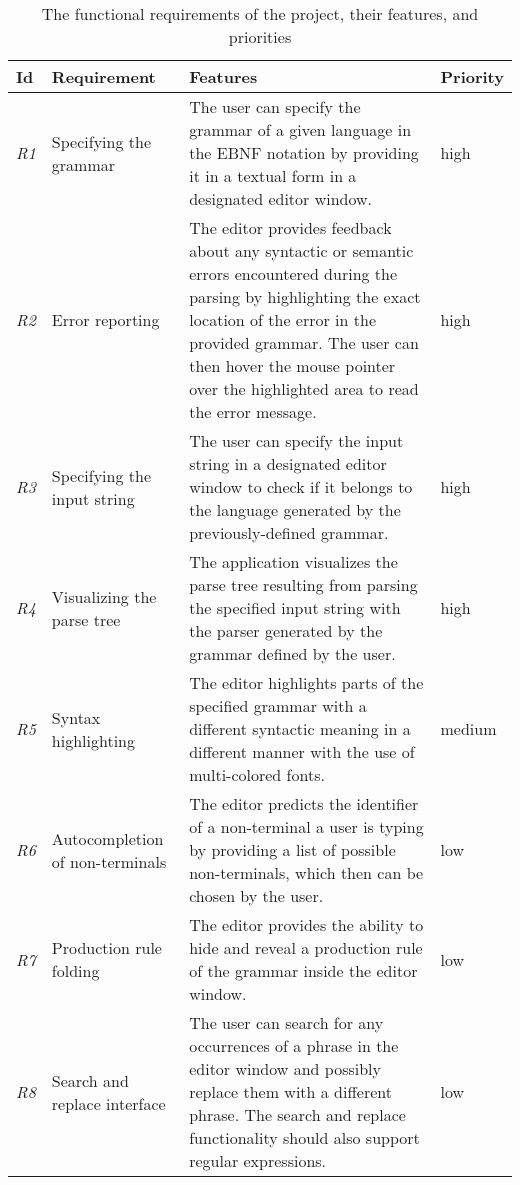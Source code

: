 \documentclass[english,engineering]{wizthesis}
\begin{document}
\begin{table}[H]
  \centering
  \caption{The functional requirements of the project, their features, and
  priorities}
  \label{tab:functional-requirements}
  \begin{tabularx}{\textwidth}{@{}lL{3cm}Xl@{}}
    \toprule
    Id & Requirement & Features & Priority \\
    \midrule
    \emph{R1} & Specifying the grammar & The user can specify the grammar of a
    given language in the EBNF notation by providing it in a textual form in
    a designated editor window. & high \\
    \addlinespace[0.5em] \emph{R2} & Error reporting & The editor provides
    feedback about any syntactic or semantic errors encountered during the
    parsing by highlighting the exact location of the error in the provided
    grammar. The user can then hover the mouse pointer over the highlighted area
    to read the error message. & high \\
    \addlinespace[0.5em] \emph{R3} & Specifying the input string & The user can
    specify the input string in a designated editor window to check if it
    belongs to the language generated by the previously-defined grammar. & high
    \\
    \addlinespace[0.5em] \emph{R4} & Visualizing the parse tree & The
    application visualizes the parse tree resulting from parsing the specified
    input string with the parser generated by the grammar defined by the user. &
    high \\
    \addlinespace[0.5em] \emph{R5} & Syntax highlighting & The editor highlights
    parts of the specified grammar with a different syntactic meaning in a
    different manner with the use of multi-colored fonts. & medium \\
    \addlinespace[0.5em] \emph{R6} & Autocompletion of non-terminals & The
    editor predicts the identifier of a non-terminal a user is typing by
    providing a list of possible non-terminals, which then can be chosen by the
    user. & low \\
    \addlinespace[0.5em] \emph{R7} & Production rule folding & The editor
    provides the ability to hide and reveal a production rule of the grammar
    inside the editor window. & low \\
    \addlinespace[0.5em] \emph{R8} & Search and replace interface & The user can
    search for any occurrences of a phrase in the editor window and possibly
    replace them with a different phrase. The search and replace functionality
    should also support regular expressions. & low \\
    \bottomrule
  \end{tabularx}
\end{table}
\end{document}
